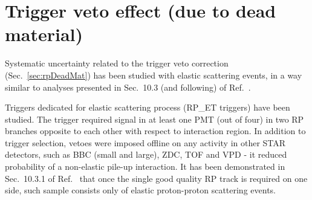 % 
% 
% 
% 


\section{Trigger veto effect (due to dead material)}\label{sec:systTrigVeto}

Systematic uncertainty related to the trigger veto correction (Sec.~\ref{sec:rpDeadMat}) has been studied with elastic scattering events, in a way similar to analyses presented in Sec.~10.3 (and following) of Ref.~\cite{supplementaryNote}. 

Triggers dedicated for elastic scattering process (RP\_ET triggers) have been studied. The trigger required signal in at least one PMT (out of four) in two RP branches opposite to each other with respect to interaction region. In addition to trigger selection, vetoes were imposed offline on any activity in other STAR detectors, such as BBC (small and large), ZDC, TOF and VPD - it reduced probability of a non-elastic pile-up interaction. It has been demonstrated in Sec.~10.3.1 of Ref.~\cite{supplementaryNote} that once the single good quality RP track is required on one side, such sample consists only of elastic proton-proton scattering events.

